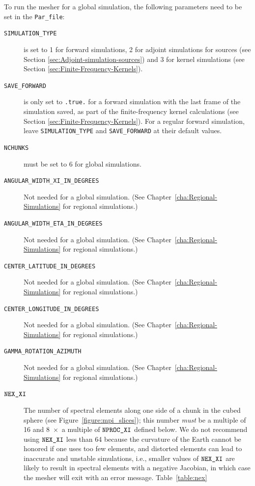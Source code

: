 \documentclass[oneside,english]{book}
\newcommand{\nexxi}{\mbox{\texttt{NEX\_XI}}}
\newcommand{\nprocxi}{\mbox{\texttt{NPROC\_XI}}}
\begin{document}
To run the mesher for a global simulation, the following parameters
need to be set in the \texttt{Par\_file}:

\begin{description}
\item [{\texttt{SIMULATION\_TYPE}}] is set to 1 for forward simulations,
2 for adjoint simulations for sources (see Section \ref{sec:Adjoint-simulation-sources})
and 3 for kernel simulations (see Section \ref{sec:Finite-Frequency-Kernels}).
\item [{\texttt{SAVE\_FORWARD}}] is only set to \texttt{.true.} for a forward
simulation with the last frame of the simulation saved, as part of
the finite-frequency kernel calculations (see Section \ref{sec:Finite-Frequency-Kernels}).
For a regular forward simulation, leave \texttt{SIMULATION\_TYPE}
and \texttt{SAVE\_FORWARD} at their default values.
\item [{\texttt{NCHUNKS}}] must be set to 6 for global simulations.
\item [{\texttt{ANGULAR\_WIDTH\_XI\_IN\_DEGREES}}] Not needed for a global
simulation. (See Chapter~\ref{cha:Regional-Simulations} for regional
simulations.)
\item [{\texttt{ANGULAR\_WIDTH\_ETA\_IN\_DEGREES}}] Not needed for a global
simulation. (See Chapter~\ref{cha:Regional-Simulations} for regional
simulations.)
\item [{\texttt{CENTER\_LATITUDE\_IN\_DEGREES}}] Not needed for a global
simulation. (See Chapter~\ref{cha:Regional-Simulations} for regional
simulations.)
\item [{\texttt{CENTER\_LONGITUDE\_IN\_DEGREES}}] Not needed for a global
simulation. (See Chapter~\ref{cha:Regional-Simulations} for regional
simulations.)
\item [{\texttt{GAMMA\_ROTATION\_AZIMUTH}}] Not needed for a global simulation.
(See Chapter~\ref{cha:Regional-Simulations}  for regional simulations.)
\item [{$\nexxi$}] The number of spectral elements along one side of a
chunk in the cubed sphere (see Figure~\ref{figure:mpi_slices});
this number \textit{must} be a multiple of 16 and 8~$\times$~a
multiple of $\nprocxi$ defined below. We do not recommend using $\nexxi$
less than 64 because the curvature of the Earth cannot be honored
if one uses too few elements, and distorted elements can lead to inaccurate
and unstable simulations, i.e., smaller values of $\nexxi$ are likely
to result in spectral elements with a negative Jacobian, in which
case the mesher will exit with an error message. Table~\ref{table:nex}

\end{description}
\end{document}
